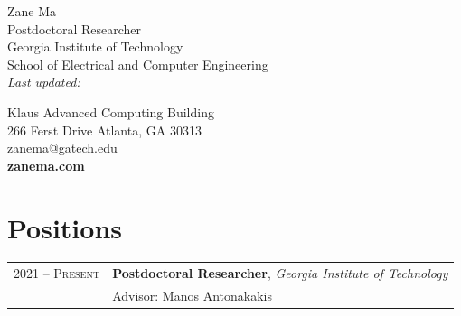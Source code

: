 \documentclass[10pt,singlecolumn]{article} %
\def\parsedate #1:20#2#3#4#5#6#7#8\empty{20#2#3/#4#5/#6#7}
\def\moddate#1{\expandafter\parsedate\pdffilemoddate{#1}\empty}
\begin{document}
\color{text1} %

\begin{minipage}[t]{0.5\textwidth}
{\Huge Zane Ma} \vspace{0.5cm}\\ %
Postdoctoral Researcher \\
Georgia Institute of Technology \\
School of Electrical and Computer Engineering \\
\emph{Last updated: \moddate{\jobname.tex}}

\end{minipage}
\begin{minipage}[t]{0.5\textwidth}
\begin{flushright}
\vspace{\baselineskip}
Klaus Advanced Computing Building \\
266 Ferst Drive Atlanta, GA 30313 \\
zanema@gatech.edu \\ 
\textbf{\href{https://zanema.com}{zanema.com}}
\end{flushright}
\end{minipage}

\vspace{0.3cm}

\section{Positions} 

\begin{tabular}{rl} %


2021 -- \textsc{Present} & \textbf{Postdoctoral Researcher}, \textit{Georgia Institute of Technology}\\ 
& Advisor: Manos Antonakakis \\
	 
	  
\end{tabular} \\
\end{document}
